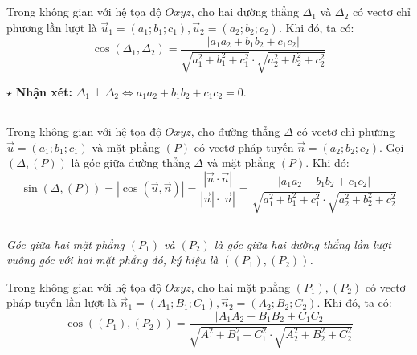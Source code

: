 \documentclass[12pt,a4paper]{extarticle}
\begin{document}
\subsection*{\color{myblue}{1. Góc giữa hai đường thẳng}}
\begin{tcolorbox}[colback=lightblue, colframe=myblue, arc=2mm]
Trong không gian với hệ tọa độ $Oxyz$, cho hai đường thẳng $\Delta_1$ và $\Delta_2$ có vectơ chỉ phương lần lượt là $\vec{u}_1 = (a_1; b_1; c_1), \vec{u}_2 = (a_2; b_2; c_2)$. Khi đó, ta có:
\[
\cos(\Delta_1, \Delta_2) = \frac{|a_1a_2 + b_1b_2 + c_1c_2|}{\sqrt{a_1^2 + b_1^2 + c_1^2} \cdot \sqrt{a_2^2 + b_2^2 + c_2^2}}
\]
\end{tcolorbox}
\noindent $\star$ \textbf{Nhận xét:} $\Delta_1 \perp \Delta_2 \iff a_1a_2 + b_1b_2 + c_1c_2 = 0$.
\vspace{0.3cm}
\subsection*{\color{myblue}{2. Góc giữa đường thẳng và mặt phẳng}}
\begin{tcolorbox}[colback=lightblue, colframe=myblue, arc=2mm]
Trong không gian với hệ tọa độ $Oxyz$, cho đường thẳng $\Delta$ có vectơ chỉ phương $\vec{u} = (a_1; b_1; c_1)$ và mặt phẳng $(P)$ có vectơ pháp tuyến $\vec{n} = (a_2; b_2; c_2)$. Gọi $(\Delta, (P))$ là góc giữa đường thẳng $\Delta$ và mặt phẳng $(P)$. Khi đó:
\[
\sin(\Delta, (P)) = |\cos(\vec{u}, \vec{n})| = \frac{|\vec{u} \cdot \vec{n}|}{|\vec{u}| \cdot |\vec{n}|} = \frac{|a_1a_2 + b_1b_2 + c_1c_2|}{\sqrt{a_1^2 + b_1^2 + c_1^2} \cdot \sqrt{a_2^2 + b_2^2 + c_2^2}}
\]
\end{tcolorbox}
\vspace{0.3cm}
\subsection*{\color{myblue}{3. Góc giữa hai mặt phẳng}}
\textit{Góc giữa hai mặt phẳng $(P_1)$ và $(P_2)$ là góc giữa hai đường thẳng lần lượt vuông góc với hai mặt phẳng đó, ký hiệu là $((P_1), (P_2))$.}
\vspace{0.2cm}
\begin{tcolorbox}[colback=lightblue, colframe=myblue, arc=2mm]
Trong không gian với hệ tọa độ $Oxyz$, cho hai mặt phẳng $(P_1), (P_2)$ có vectơ pháp tuyến lần lượt là $\vec{n}_1 = (A_1; B_1; C_1), \vec{n}_2 = (A_2; B_2; C_2)$. Khi đó, ta có:
\[
\cos((P_1), (P_2)) = \frac{|A_1A_2 + B_1B_2 + C_1C_2|}{\sqrt{A_1^2 + B_1^2 + C_1^2} \cdot \sqrt{A_2^2 + B_2^2 + C_2^2}}
\]
\end{tcolorbox}
\end{document}
